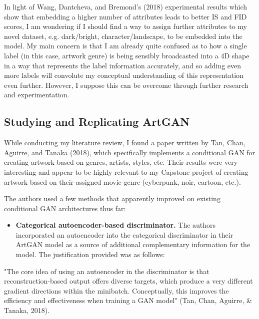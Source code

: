 \documentclass[11pt]{article}
\providecommand{\tightlist}{%
      \setlength{\itemsep}{0pt}\setlength{\parskip}{0pt}}
\begin{document}
In light of Wang, Dantcheva, and Bremond's (2018) experimental results
which show that embedding a higher number of attributes leads to better
IS and FID scores, I am wondering if I should find a way to assign
further attributes to my novel dataset, e.g. dark/bright,
character/landscape, to be embedded into the model. My main concern is
that I am already quite confused as to how a single label (in this case,
artwork genre) is being sensibly broadcasted into a 4D shape in a way
that represents the label information accurately, and so adding even
more labels will convolute my conceptual understanding of this
representation even further. However, I suppose this can be overcome
through further research and experimentation.

\subsection{Studying and Replicating
ArtGAN}\label{studying-and-replicating-artgan}

While conducting my literature review, I found a paper written by Tan,
Chan, Aguirre, and Tanaka (2018), which specifically implements a
conditional GAN for creating artwork based on genres, artists, styles,
etc. Their results were very interesting and appear to be highly
relevant to my Capstone project of creating artwork based on their
assigned movie genre (cyberpunk, noir, cartoon, etc.).

The authors used a few methods that apparently improved on existing
conditional GAN architectures thus far:

\begin{itemize}
\tightlist
\item
  \textbf{Categorical autoencoder-based discriminator.} The authors
  incorporated an autoencoder into the categorical discriminator in
  their ArtGAN model as a source of additional complementary information
  for the model. The justification provided was as follows:
\end{itemize}

"The core idea of using an autoencoder in the discriminator is that
reconstruction-based output offers diverse targets, which produce a very
different gradient directions within the minibatch. Conceptually, this
improves the efficiency and effectiveness when training a GAN model"
(Tan, Chan, Aguirre, \& Tanaka, 2018).
\end{document}

